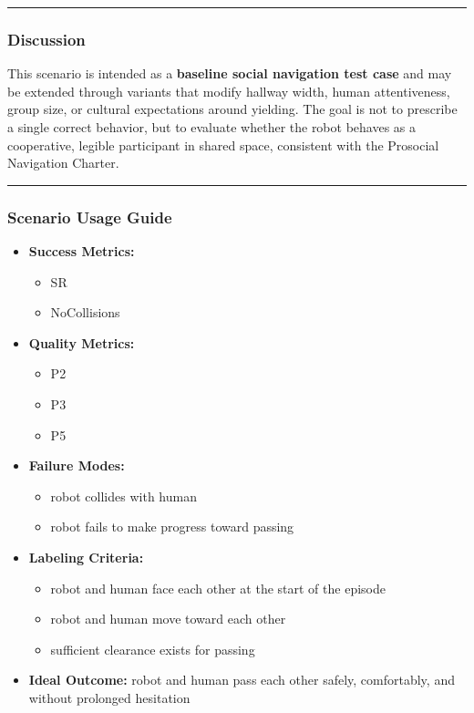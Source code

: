 \documentclass[utf8]{frontiers_suppmat} %
\providecommand{\tightlist}{%
  \setlength{\itemsep}{0pt}\setlength{\parskip}{0pt}}
\begin{document}
\begin{center}\rule{0.5\linewidth}{0.5pt}\end{center}

\subsubsection{Discussion}\label{discussion}

This scenario is intended as a \textbf{baseline social navigation test
case} and may be extended through variants that modify hallway width,
human attentiveness, group size, or cultural expectations around
yielding. The goal is not to prescribe a single correct behavior, but to
evaluate whether the robot behaves as a cooperative, legible participant
in shared space, consistent with the Prosocial Navigation Charter.

\begin{center}\rule{0.5\linewidth}{0.5pt}\end{center}

\subsubsection{Scenario Usage Guide}\label{scenario-usage-guide}

\begin{itemize}
\tightlist
\item
  \textbf{Success Metrics:}

  \begin{itemize}
  \tightlist
  \item
    SR
  \item
    NoCollisions
  \end{itemize}
\item
  \textbf{Quality Metrics:}

  \begin{itemize}
  \tightlist
  \item
    P2
  \item
    P3
  \item
    P5
  \end{itemize}
\item
  \textbf{Failure Modes:}

  \begin{itemize}
  \tightlist
  \item
    robot collides with human
  \item
    robot fails to make progress toward passing
  \end{itemize}
\item
  \textbf{Labeling Criteria:}

  \begin{itemize}
  \tightlist
  \item
    robot and human face each other at the start of the episode
  \item
    robot and human move toward each other
  \item
    sufficient clearance exists for passing
  \end{itemize}
\item
  \textbf{Ideal Outcome:} robot and human pass each other safely,
  comfortably, and without prolonged hesitation
\end{itemize}
\end{document}
